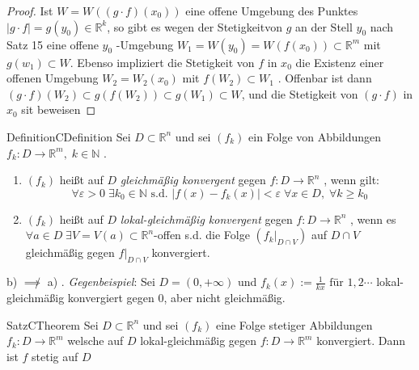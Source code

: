 \documentclass[a4paper]{memoir}
\begin{document}
\begin{proof}
	Ist $ W = W \left( \left( g \cdot f \right) \left( x_0 \right)  \right)  $ eine offene Umgebung des Punktes $ \left| g \cdot f\right| 
	= g(y_0) \in \mathbb{R}^k $, so gibt es wegen der Stetigkeitvon $ g $ an der Stell $ y_0 $ nach Satz 15 eine offene $ y_0 $ -Umgebung
	$ W_1 = W(y_0) = W \left( f \left( x_0 \right)  \right) \subset  \mathbb{R}^m $ mit $ g \left( w_1 \right) \subset W $. Ebenso 
	impliziert die Stetigkeit von $ f $ in $ x_0 $ die Existenz einer offenen Umgebung $ W_2 = W_2 \left( x_0 \right) $ mit
	$ f \left( W_2 \right) \subset W_1 $ . Offenbar ist dann $ \left( g \cdot f \right) \left( W_2 \right) \subset g \left( f 
	\left( W_2 \right) \right) \subset g \left( W_1 \right) \subset W $, und die Stetigkeit von $ \left( g \cdot f \right)  $ in
	$ x_0 $ sit beweisen
\end{proof}
\begin{ibox}[]{Definition}{CDefinition}
    Sei $ D \subset \mathbb{R}^n  $ und sei $ \left( f_{k} \right)  $ ein Folge von Abbildungen $ f_{k}: D \to \mathbb{R}^m, \; k \in 
	\mathbb{N} $ .
	\begin{enumerate}[label=\alph*)]
		\item $ \left( f_{k} \right)  $ heißt auf $ D $  \textit{gleichmäßig konvergent} gegen $ f: D \to \mathbb{R}^n $ , wenn gilt:
			$$ \forall \varepsilon > 0 \; \exists k_0 \in \mathbb{N} \text{ s.d. } \left| f(x) - f_{k}(x) \right| < \varepsilon \; 
			\forall x \in  D, \; \forall k \geq k_0$$
		\item $ \left( f_{k} \right)  $ heißt auf $ D $  \textit{lokal-gleichmäßig konvergent} gegen $ f: D \to \mathbb{R}^n $ , wenn es
			$ \forall a \in D \; \exists V = V(a) \subset  \mathbb{R}^n $-offen s.d. die Folge 
			$ \left( \left. f_{k} \right|_{D \cap V} \right)  $ auf $ D \cap V $ gleichmäßig gegen 
			$ \left. f \right|_{D \cap V}  $ konvergiert.
	\end{enumerate}
\end{ibox}

b) $\not \implies$ a) . \textit{Gegenbeispiel}: Sei $ D = (0, + \infty) $ und $ f_{k}(x) := \frac{1}{kx} \text{ für } 1,2 \cdots  $ 
lokal-gleichmäßig konvergiert gegen $ 0 $, aber nicht gleichmäßig.

\begin{ibox}[20]{Satz}{CTheorem}
    Sei $ D \subset  \mathbb{R}^n  $ und sei $ \left( f_k \right)  $ eine Folge stetiger Abbildungen $ f_k : D \to \mathbb{R}^m $ 
	welsche auf $ D $ lokal-gleichmäßig gegen $ f: D \to \mathbb{R}^m $ konvergiert. Dann ist $ f $ stetig auf $ D $ 
\end{ibox}
\end{document}
